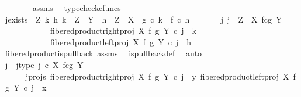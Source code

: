 \begin{isabellebody}
\ \ \ \ \ \ \isamarkupfalse%
\ assms\ \isamarkupfalse%
\ typecheck{\isacharunderscore}{\kern0pt}cfuncs\isanewline
\isanewline
\ \ \ \ \isamarkupfalse%
\ j{\isacharunderscore}{\kern0pt}exists{\isacharcolon}{\kern0pt}\ {\isachardoublequoteopen}{\isasymAnd}\ Z\ k\ h{\isachardot}{\kern0pt}\ k\ {\isacharcolon}{\kern0pt}\ Z\ {\isasymrightarrow}\ Y\ {\isasymLongrightarrow}\ h\ {\isacharcolon}{\kern0pt}\ Z\ {\isasymrightarrow}\ X\ {\isasymLongrightarrow}\ g\ {\isasymcirc}\isactrlsub c\ k\ {\isacharequal}{\kern0pt}\ f\ {\isasymcirc}\isactrlsub c\ h\ {\isasymLongrightarrow}\isanewline
\ \ \ \ \ \ {\isacharparenleft}{\kern0pt}{\isasymexists}{\isacharbang}{\kern0pt}j{\isachardot}{\kern0pt}\ j\ {\isacharcolon}{\kern0pt}\ Z\ {\isasymrightarrow}\ X\ \isactrlbsub f\isactrlesub {\isasymtimes}\isactrlsub c\isactrlbsub g\isactrlesub \ Y\ {\isasymand}\isanewline
\ \ \ \ \ \ \ \ \ \ \ \ fibered{\isacharunderscore}{\kern0pt}product{\isacharunderscore}{\kern0pt}right{\isacharunderscore}{\kern0pt}proj\ X\ f\ g\ Y\ {\isasymcirc}\isactrlsub c\ j\ {\isacharequal}{\kern0pt}\ k\ {\isasymand}\isanewline
\ \ \ \ \ \ \ \ \ \ \ \ fibered{\isacharunderscore}{\kern0pt}product{\isacharunderscore}{\kern0pt}left{\isacharunderscore}{\kern0pt}proj\ X\ f\ g\ Y\ {\isasymcirc}\isactrlsub c\ j\ {\isacharequal}{\kern0pt}\ h{\isacharparenright}{\kern0pt}{\isachardoublequoteclose}\isanewline
\ \ \ \ \ \ \isamarkupfalse%
\ fibered{\isacharunderscore}{\kern0pt}product{\isacharunderscore}{\kern0pt}is{\isacharunderscore}{\kern0pt}pullback\ assms\ \isamarkupfalse%
\ is{\isacharunderscore}{\kern0pt}pullback{\isacharunderscore}{\kern0pt}def\ \isamarkupfalse%
\ auto\isanewline
\isanewline
\ \ \ \ \isamarkupfalse%
\ j\ \ j{\isacharunderscore}{\kern0pt}type{\isacharcolon}{\kern0pt}\ {\isachardoublequoteopen}j\ {\isasymin}\isactrlsub c\ X\ \isactrlbsub f\isactrlesub {\isasymtimes}\isactrlsub c\isactrlbsub g\isactrlesub \ Y{\isachardoublequoteclose}\ \ \isanewline
\ \ \ \ \ \ j{\isacharunderscore}{\kern0pt}projs{\isacharcolon}{\kern0pt}\ {\isachardoublequoteopen}fibered{\isacharunderscore}{\kern0pt}product{\isacharunderscore}{\kern0pt}right{\isacharunderscore}{\kern0pt}proj\ X\ f\ g\ Y\ {\isasymcirc}\isactrlsub c\ j\ {\isacharequal}{\kern0pt}\ y{\isachardoublequoteclose}\ {\isachardoublequoteopen}fibered{\isacharunderscore}{\kern0pt}product{\isacharunderscore}{\kern0pt}left{\isacharunderscore}{\kern0pt}proj\ X\ f\ g\ Y\ {\isasymcirc}\isactrlsub c\ j\ {\isacharequal}{\kern0pt}\ x{\isachardoublequoteclose}\isanewline

\end{isabellebody}

